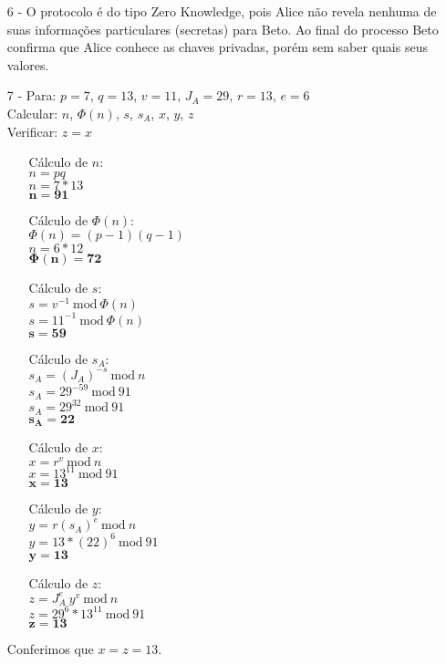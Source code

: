 \documentclass[12pt]{article}
\newcommand{\modd}{\ \text{mod}\ }
\begin{document}
\begin{itemize}
			\item[6 -]
				O protocolo é do tipo Zero Knowledge, pois Alice não revela
				nenhuma de suas informações particulares (secretas) para Beto.
				Ao final do processo Beto confirma que Alice conhece as chaves
				privadas, porém sem saber quais seus valores.
			\item[7 -]
				Para: $p = 7$, $q = 13$, $v = 11$, $J_A = 29$, $r = 13$, $e = 6$\\
				Calcular: $n$, $\Phi(n)$, $s$, $s_A$, $x$, $y$, $z$\\
				Verificar: $z = x$
				\begin{center}
					\begin{itemize}
						\item[]
							Cálculo de $n$:\\
							$n = pq$\\
							$n = 7*13$\\
							$\mathbf{n = 91}$
						\item[]
							Cálculo de $\Phi(n)$:\\
							$\Phi(n) = (p-1)(q-1)$\\
							$n = 6*12$\\
							$\mathbf{\Phi(n) = 72}$
						\item[]
							Cálculo de $s$:\\
							$s = v^{-1} \modd \Phi(n)$\\
							$s = 11^{-1} \modd \Phi(n)$\\
							$\mathbf{s  = 59}$
						\item[]
							Cálculo de $s_A$:\\
							$s_A = (J_A)^{-s} \modd n$\\
							$s_A = 29^{-59} \modd 91$\\
							$s_A = 29^{32} \modd 91$\\							
							$\mathbf{s_A  = 22}$
						\item[]
							Cálculo de $x$:\\
							$x = r^{v} \modd n$\\
							$x = 13^{11} \modd 91$\\						
							$\mathbf{x  = 13}$
						\item[]
							Cálculo de $y$:\\
							$y = r(s_A)^{e} \modd n$\\
							$y = 13*(22)^{6} \modd 91$\\						
							$\mathbf{y  = 13}$
						\item[]
							Cálculo de $z$:\\
							$z = J_A^{e} \ y^{v} \modd n$\\
							$z = 29^{6} * 13^{11} \modd 91$\\						
							$\mathbf{z  = 13}$
					\end{itemize}	
				 \end{center}
			Conferimos que $x = z = 13$.	 
		\end{itemize}																		
\end{document}
